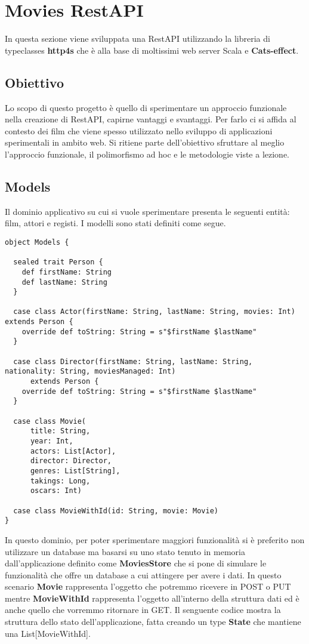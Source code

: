 \chapter{Movies RestAPI}
In questa sezione viene sviluppata una RestAPI utilizzando la libreria di typeclasses \textbf{http4s} che è alla base di moltissimi web server Scala e \textbf{Cats-effect}.

\section{Obiettivo}
Lo scopo di questo progetto è quello di sperimentare un approccio funzionale nella creazione di RestAPI, capirne vantaggi e svantaggi. Per farlo ci si affida al contesto dei film che viene spesso utilizzato nello sviluppo di applicazioni sperimentali in ambito web. Si ritiene parte dell'obiettivo sfruttare al meglio l'approccio funzionale, il polimorfismo ad hoc e le metodologie viste a lezione.

\section{Models}
Il dominio applicativo su cui si vuole sperimentare presenta le seguenti entità: film, attori e registi. I modelli sono stati definiti come segue.

\begin{verbatim}
object Models {

  sealed trait Person {
    def firstName: String
    def lastName: String
  }

  case class Actor(firstName: String, lastName: String, movies: Int) extends Person {
    override def toString: String = s"$firstName $lastName"
  }

  case class Director(firstName: String, lastName: String, nationality: String, moviesManaged: Int)
      extends Person {
    override def toString: String = s"$firstName $lastName"
  }

  case class Movie(
      title: String,
      year: Int,
      actors: List[Actor],
      director: Director,
      genres: List[String],
      takings: Long,
      oscars: Int)

  case class MovieWithId(id: String, movie: Movie)
}
\end{verbatim}

\noindent In questo dominio, per poter sperimentare maggiori funzionalità si è preferito non utilizzare un database ma basarsi su uno stato tenuto in memoria dall'applicazione definito come \textbf{MoviesStore} che si pone di simulare le funzionalità che offre un database a cui attingere per avere i dati. In questo scenario \textbf{Movie} rappresenta l'oggetto che potremmo ricevere in POST o PUT mentre \textbf{MovieWithId} rappresenta l'oggetto all'interno della struttura dati ed è anche quello che vorremmo ritornare in GET. Il senguente codice mostra la struttura dello stato dell'applicazione, fatta creando un type \textbf{State} che mantiene una List[MovieWithId]. 

